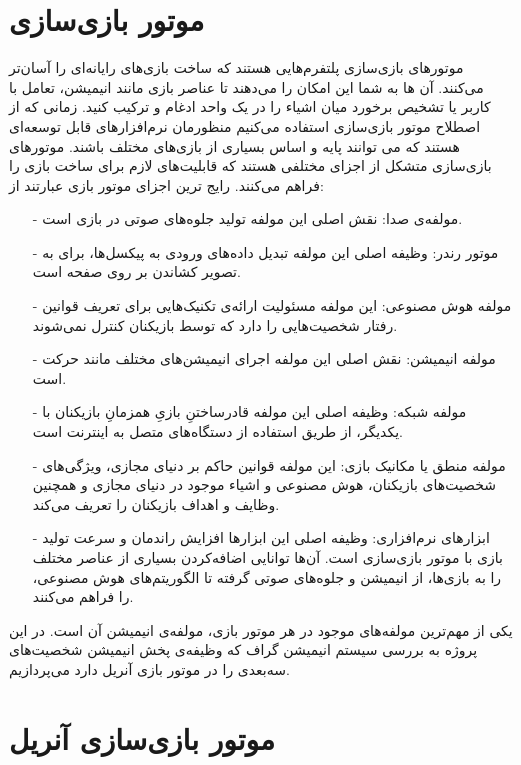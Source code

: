 \section{موتور بازی‌سازی}
موتور‌های بازی‌سازی پلتفرم‌هایی هستند که ساخت بازی‌های رایانه‌ای را آسان‌تر می‌کنند.
آن ها به شما این امکان را می‌دهند تا عناصر بازی مانند انیمیشن، تعامل با کاربر یا تشخیص برخورد میان اشیاء را در یک واحد ادغام و ترکیب کنید.
\cite{barczak2019comparative}
زمانی که از اصطلاح موتور بازی‌سازی استفاده می‌کنیم منظورمان نرم‌افزارهای قابل توسعه‌ای هستند که می توانند پایه و اساس بسیاری از بازی‌های مختلف باشند.
\cite{GameEngineArchitecture}
موتورهای بازی‌سازی متشکل از اجزای مختلفی هستند که قابلیت‌های لازم برای ساخت بازی را فراهم می‌کنند.
رایج ترین اجزای موتور بازی عبارتند از:
\cite{barczak2019comparative}
\begin{itemize}
    \item[-] مولفه‌ی صدا: نقش اصلی این مولفه تولید جلوه‌های صوتی در بازی است.
    \item[-] موتور رندر: وظیفه اصلی این مولفه تبدیل داده‌های ورودی به پیکسل‌ها، برای به تصویر کشاندن بر روی صفحه است.
    \item[-] مولفه هوش مصنوعی: این مولفه مسئولیت ارائه‌ی تکنیک‌هایی برای تعریف قوانین رفتار شخصیت‌هایی را دارد که توسط بازیکنان کنترل نمی‌شوند.
    \item[-] مولفه انیمیشن: نقش اصلی این مولفه اجرای انیمیشن‌های مختلف مانند حرکت است.
    \item[-] مولفه شبکه: وظیفه اصلی این مولفه قادرساختنِ بازیِ همزمانِ بازیکنان با یکدیگر، از طریق استفاده از دستگاه‌های متصل به اینترنت است.
    \item[-] مولفه منطق یا مکانیک بازی: این مولفه قوانین حاکم بر دنیای مجازی، ویژگی‌های شخصیت‌های بازیکنان، هوش مصنوعی و اشیاء موجود در دنیای مجازی و همچنین وظایف و اهداف بازیکنان را تعریف می‌کند.
    \item[-] ابزارهای نرم‌افزاری: وظیفه اصلی این ابزارها افزایش راندمان و سرعت تولید بازی با موتور بازی‌سازی است. آن‌ها توانایی اضافه‌کردن بسیاری از عناصر مختلف را به بازی‌ها، از انیمیشن و جلوه‌های صوتی گرفته تا الگوریتم‌های هوش مصنوعی، را فراهم می‌کنند.   
\end{itemize}

یکی از مهم‌ترین مولفه‌های موجود در هر موتور بازی، مولفه‌ی انیمیشن آن است. در این پروژه به بررسی سیستم
انیمیشن گراف که وظیفه‌ی پخش انیمیشن‌ شخصیت‌های سه‌بعدی را در موتور بازی آنریل دارد می‌پردازیم.



\section {موتور بازی‌سازی آنریل}

